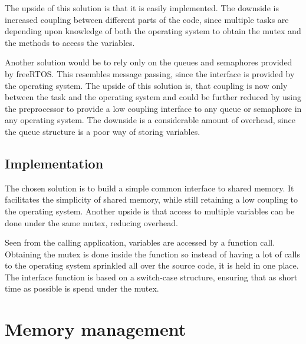 The upside of this solution is that it is easily implemented. The downside is
increased coupling between different parts of the code, since multiple tasks are
depending upon knowledge of both the operating system to obtain the mutex and
the methods to access the variables.

Another solution would be to rely only on the queues and semaphores provided by
freeRTOS. This resembles message passing, since the interface is provided by the
operating system. The upside of this solution is, that coupling is now only
between the task and the operating system and could be further reduced by using
the preprocessor to provide a low coupling interface to any queue or semaphore
in any operating system. The downside is a considerable amount of overhead,
since the queue structure is a poor way of storing variables.

\subsection{Implementation}
The chosen solution is to build a simple common interface to shared memory. It
facilitates the simplicity of shared memory, while still retaining a low
coupling to the operating system. Another upside is that access to multiple
variables can be done under the same mutex, reducing overhead.

Seen from the calling application, variables are accessed by a function call.
Obtaining the mutex is done inside the function so instead of having a lot of
calls to the operating system sprinkled all over the source code, it is held in
one place. The interface function is based on a switch-case structure, ensuring
that as short time as possible is spend under the mutex.


\section{Memory management}

